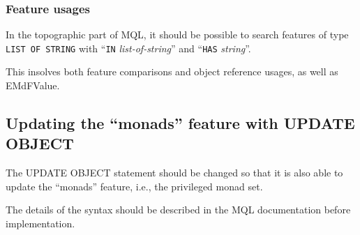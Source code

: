 \documentclass[a4paper,12pt]{article}
\begin{document}
\subsubsection{Feature usages}

In the topographic part of MQL, it should be possible to search
features of type \texttt{LIST OF STRING} with ``\texttt{IN}
\textit{list-of-string}'' and ``\texttt{HAS} \textit{string}''.

This insolves both feature comparisons and object reference usages, as
well as EMdFValue.

\subsection{Updating the ``monads'' feature with UPDATE OBJECT}

The UPDATE OBJECT statement should be changed so that it is also able
to update the ``monads'' feature, i.e., the privileged monad set.

The details of the syntax should be described in the MQL documentation
before implementation.
\end{document}
